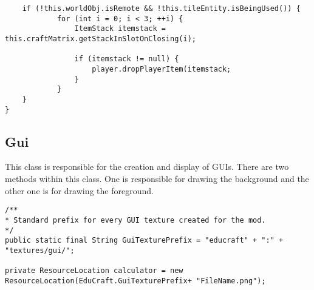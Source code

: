 \begin{itemize}
\begin{lstlisting}
	if (!this.worldObj.isRemote && !this.tileEntity.isBeingUsed()) {
			for (int i = 0; i < 3; ++i) {
				ItemStack itemstack = this.craftMatrix.getStackInSlotOnClosing(i);
            
				if (itemstack != null) {
					player.dropPlayerItem(itemstack;
				}
			}
	}
}
\end{lstlisting}
\end{itemize}

\subsection{Gui}
This class is responsible for the creation and display of GUIs.
There are two methods within this class. One is responsible for drawing the background and the other one is for drawing the foreground.\newline\newline
\begin{lstlisting}
/**
* Standard prefix for every GUI texture created for the mod.
*/
public static final String GuiTexturePrefix = "educraft" + ":" + "textures/gui/";

private ResourceLocation calculator = new ResourceLocation(EduCraft.GuiTexturePrefix+ "FileName.png");
\end{lstlisting}

